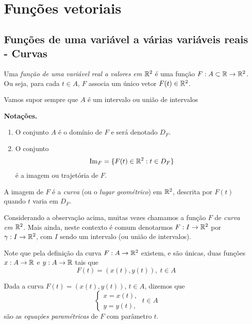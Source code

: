 \chapter{Funções vetoriais}

\section{Funções de uma variável a várias variáveis reais - Curvas}

\begin{definition}
    Uma \textit{função de uma variável real a valores em} \(\mathbb{R}^2\) \label{Curva em R^2} é uma função \(F:A\subset\mathbb{R} \to \mathbb{R}^2\). Ou seja, para cada \(t\in A\), \(F\) associa um único vetor \(F(t)\in\mathbb{R}^2\).
\end{definition}

Vamos supor sempre que \(A\) é um intervalo ou união de intervalos 

\textbf{Notações. }
    \begin{enumerate}
        \item O conjunto \(A\) é o domínio de \(F\) e será denotado \(D_F\).
        \item O conjunto \[\operatorname{Im}_F = \{F(t)\in\mathbb{R}^2 : t\in D_F\}\] é a imagem ou trajetória de \(F\).
    \end{enumerate}

\begin{remark}
    A imagem de \(F\) é a \textit{curva} (ou o \textit{lugar geométrico}) em \(\mathbb{R}^2\), descrita por \(F(t)\) quando \(t\) varia em \(D_F\).
\end{remark}

Considerando a observação acima, muitas vezes chamamos a função \(F\) de \textit{curva em } \(\mathbb{R}^2\). Mais ainda, neste contexto é comum denotarmos \(F: I \to \mathbb{R}^2\) por \(\gamma: I \to \mathbb{R}^2\), com \(I\) sendo um intervalo (ou união de intervalos).

\begin{remark}
    Note que pela definição da curva \(F: A \to \mathbb{R}^2\) existem, e são únicas, duas funções \(x: A \to \mathbb{R}\) e \(y: A \to \mathbb{R}\) tais que \[F(t) = (x(t), y(t)),\; t\in A\]%
\end{remark}

\begin{definition}
    Dada a curva \(F(t) = (x(t),y(t))\), \(t\in A\), dizemos que \[\begin{cases}
        x = x(t), \\
        y = y(t),
    \end{cases} \; t\in A\] são as \textit{equações paramétricas}\label{Curva! Equações paramétricas} de \(F\) com parâmetro \(t\).
\end{definition}

